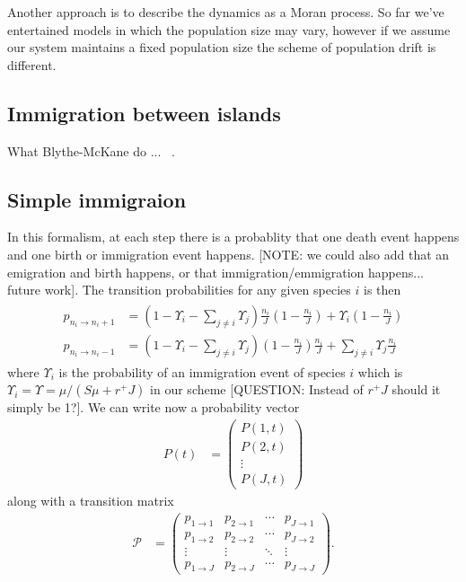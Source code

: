 \documentclass[11pt,a4paper,final]{iopart}
\begin{document}
Another approach is to describe the dynamics as a Moran process.
So far we've entertained models in which the population size may vary, however if we assume our system maintains a fixed population size the scheme of population drift is different.

\subsection{Immigration between islands}

What Blythe-McKane do ... ~\cite{Blythe2007}.

\subsection{Simple immigraion}
In this formalism, at each step there is a probablity that one death event happens and one birth or immigration event happens.
[NOTE: we could also add that an emigration and birth happens, or that immigration/emmigration happens... future work].
The transition probabilities for any given species $i$ is then
\begin{align}\label{morantransition}
\begin{split}
p_{n_i \rightarrow n_i+1} &= (1-\Upsilon_i-\sum_{j\neq i} \Upsilon_j) \frac{n_i}{J} (1 - \frac{n_i}{J}) + \Upsilon_i (1-\frac{n_i}{J}) \\
p_{n_i \rightarrow n_i-1} &= (1-\Upsilon_i-\sum_{j\neq i} \Upsilon_j) (1 - \frac{n_i}{J}) \frac{n_i}{J} + \sum_{j\neq i} \Upsilon_j \frac{n_i}{J}
\end{split}
\end{align}
where $\Upsilon_i$ is the probability of an immigration event of species $i$ which is $\Upsilon_i = \Upsilon = \mu / (S\mu + r^+J)$ in our scheme [QUESTION: Instead of $r^+J$ should it simply be 1?].
We can write now a probability vector
\begin{align*}
P(t) &= 
\begin{pmatrix}
P(1,t) \\
P(2,t) \\
\vdots \\
P(J,t)
\end{pmatrix}
\end{align*}
along with a transition matrix
\begin{align*}
\mathcal{P} &=
\begin{pmatrix}
p_{1 \rightarrow 1} & p_{2 \rightarrow 1} & \cdots & p_{J \rightarrow 1} \\
p_{1 \rightarrow 2} & p_{2 \rightarrow 2} & \cdots & p_{J \rightarrow 2} \\
\vdots & \vdots & \ddots & \vdots \\
p_{1 \rightarrow J} & p_{2 \rightarrow J} & \cdots & p_{J \rightarrow J}
\end{pmatrix}.
\end{align*}
\end{document}
